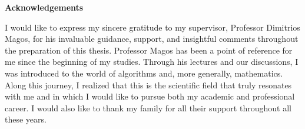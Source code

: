 \clearpage

\begin{center}
{\Large \textbf{Acknowledgements}}
\end{center}

\vspace{1cm}

I would like to express my sincere gratitude to my supervisor, Professor Dimitrios Magos, for his invaluable guidance, support, and insightful comments throughout the preparation of this thesis. Professor Magos has been a point of reference for me since the beginning of my studies. Through his lectures and our discussions, I was introduced to the world of algorithms and, more generally, mathematics. Along this journey, I realized that this is the scientific field that truly resonates with me and in which I would like to pursue both my academic and professional career. I would also like to thank my family for all their support throughout all these years.


\clearpage